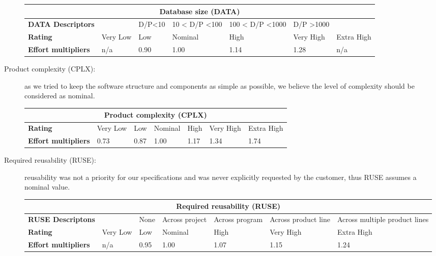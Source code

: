 \begin{description}
\begin{tabular}{|p{}|p{}|p{}|p{}|p{}|p{}|p{}|}
\hline
         \multicolumn{7}{|c|}{\textbf{Database size (DATA)}} \\ \hline  \hline
	\textbf{DATA Descriptors} & & D/P<10&10 < D/P <100 &100 < D/P <1000 & D/P >1000  & \\ \hline
	\textbf{Rating}&Very Low & Low & Nominal  & High & Very High &Extra High\\ \hline
	\textbf{Effort multipliers} & n/a & 0.90 & 1.00 & 1.14 & 1.28 &  n/a \\ \hline
\end{tabular}

\item[Product complexity (CPLX):] as we tried to keep the software structure and components as simple as possible, we believe the level of complexity should be considered as nominal.

\begin{tabular}{|p{}|p{}|p{}|p{}|p{}|p{}|p{}|}
\hline
         \multicolumn{7}{|c|}{\textbf{Product complexity (CPLX)}} \\ \hline  \hline
	\textbf{Rating}&Very Low & Low & Nominal  & High & Very High &Extra High\\ \hline
	\textbf{Effort multipliers} & 0.73 & 0.87 & 1.00 & 1.17 & 1.34 &  1.74 \\ \hline
\end{tabular}

\item[Required reusability (RUSE):] reusability was not a priority for our specifications and was never explicitly requested by the customer, thus RUSE assumes a nominal value.

\begin{tabular}{|p{}|p{}|p{}|p{}|p{}|p{}|p{}|}
\hline
         \multicolumn{7}{|c|}{\textbf{Required reusability (RUSE)}} \\ \hline  \hline
         	\textbf{RUSE Descriptons} & & None & Across project & Across program& Across product line &Across multiple product lines \\ \hline
	\textbf{Rating}&Very Low & Low & Nominal  & High & Very High &Extra High\\ \hline
	\textbf{Effort multipliers} & n/a & 0.95 & 1.00 & 1.07 & 1.15 &  1.24 \\ \hline
\end{tabular}


\end{description}
